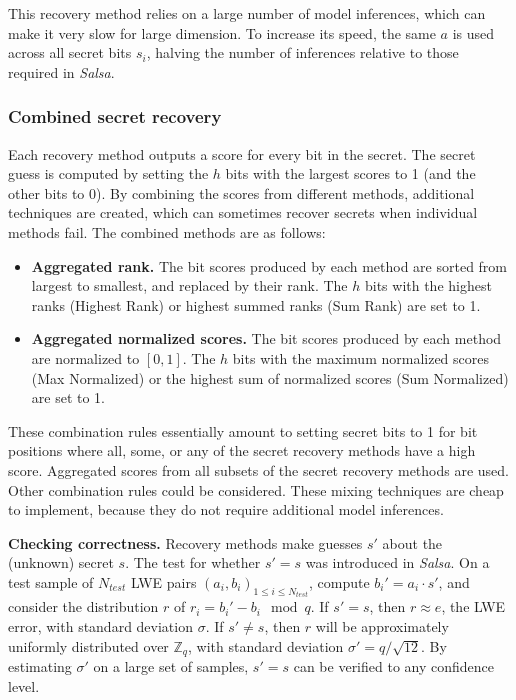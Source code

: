 \documentclass{article}
\begin{document}
This recovery method relies on a large number of model inferences, which can make it very slow for large dimension. To increase its speed, the same \( a \) is used across all secret bits \( s_i \), halving the number of inferences relative to those required in \textit{Salsa}.

\subsubsection{Combined secret recovery}
Each recovery method outputs a score for every bit in the secret. The secret guess is computed by setting the \( h \) bits with the largest scores to 1 (and the other bits to 0). By combining the scores from different methods, additional techniques are created, which can sometimes recover secrets when individual methods fail. The combined methods are as follows:
\begin{itemize}
    \item \textbf{Aggregated rank.} The bit scores produced by each method are sorted from largest to smallest, and replaced by their rank. The \( h \) bits with the highest ranks (Highest Rank) or highest summed ranks (Sum Rank) are set to 1.
    \item \textbf{Aggregated normalized scores.} The bit scores produced by each method are normalized to \([0, 1]\). The \( h \) bits with the maximum normalized scores (Max Normalized) or the highest sum of normalized scores (Sum Normalized) are set to 1.
\end{itemize}

These combination rules essentially amount to setting secret bits to 1 for bit positions where all, some, or any of the secret recovery methods have a high score. Aggregated scores from all subsets of the secret recovery methods are used. Other combination rules could be considered. These mixing techniques are cheap to implement, because they do not require additional model inferences.

\textbf{Checking correctness.} Recovery methods make guesses \( s' \) about the (unknown) secret \( s \). The test for whether \( s' = s \) was introduced in \textit{Salsa}. On a test sample of \( N_{test} \) LWE pairs \( (a_i, b_i)_{1 \leq i \leq N_{test}} \), compute \( b_i' = a_i \cdot s' \), and consider the distribution \( r \) of \( r_i = b_i' - b_i \mod q \). If \( s' = s \), then \( r \approx e \), the LWE error, with standard deviation \( \sigma \). If \( s' \neq s \), then \( r \) will be approximately uniformly distributed over \( \mathbb{Z}_q \), with standard deviation \( \sigma' = q / \sqrt{12} \). By estimating \( \sigma' \) on a large set of samples, \( s' = s \) can be verified to any confidence level.
\end{document}
